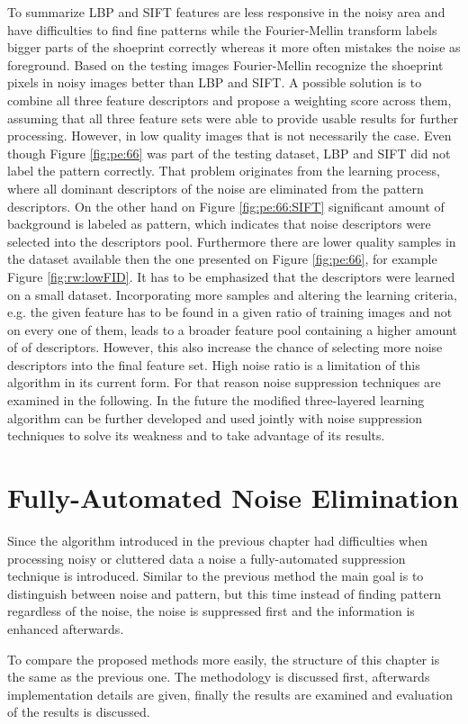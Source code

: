 \documentclass[draft,final]{vutinfth} %
\begin{document}
\par
To summarize LBP and SIFT features are less responsive in the noisy area and have difficulties to find fine patterns while the Fourier-Mellin transform labels bigger parts of the shoeprint correctly whereas it more often mistakes the noise as foreground.
Based on the testing images Fourier-Mellin recognize the shoeprint pixels in noisy images better than LBP and SIFT.
A possible solution is to combine all three feature descriptors and propose a weighting score across them, assuming that all three feature sets were able to provide usable results for further processing.
However, in low quality images that is not necessarily the case.
Even though Figure \ref{fig:pe:66} was part of the testing dataset, LBP and SIFT did not label the pattern correctly.
That problem originates from the learning process, where all dominant descriptors of the noise are eliminated from the pattern descriptors.
On the other hand on Figure \ref{fig:pe:66:SIFT} significant amount of background is labeled as pattern, which indicates that noise descriptors were selected into the descriptors pool.
Furthermore there are lower quality samples in the dataset available then the one presented on Figure  \ref{fig:pe:66}, for example Figure \ref{fig:rw:lowFID}.
It has to be emphasized that the descriptors were learned on a small dataset.
Incorporating more samples and altering the learning criteria, e.g. the given feature has to be found in a given ratio of training images and not on every one of them, leads to a broader feature pool containing a higher amount of of descriptors.
However, this also increase the chance of selecting more noise descriptors into the final feature set.
High noise ratio is a limitation of this algorithm in its current form.
For that reason noise suppression techniques are examined in the following.
In the future the modified three-layered learning algorithm can be further developed and used jointly with noise suppression techniques to solve its weakness and to take advantage of its results.

\chapter{Fully-Automated Noise Elimination}

Since the algorithm introduced in the previous chapter had difficulties when processing noisy or cluttered data a noise a fully-automated suppression technique is introduced.
Similar to the previous method the main goal is to distinguish between noise and pattern, but this time instead of finding pattern regardless of the noise, the noise is suppressed first and the information is enhanced afterwards.
\par
To compare the proposed methods more easily, the structure of this chapter is the same as the previous one.
The methodology is discussed first, afterwards implementation details are given, finally the results are examined and evaluation of the results is discussed.
\end{document}
